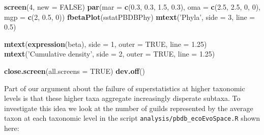 \documentclass[]{article}
\newenvironment{Shaded}{\begin{snugshade}}{\end{snugshade}}
\newcommand{\KeywordTok}[1]{\textcolor[rgb]{0.13,0.29,0.53}{\textbf{#1}}}
\newcommand{\DataTypeTok}[1]{\textcolor[rgb]{0.13,0.29,0.53}{#1}}
\newcommand{\DecValTok}[1]{\textcolor[rgb]{0.00,0.00,0.81}{#1}}
\newcommand{\FloatTok}[1]{\textcolor[rgb]{0.00,0.00,0.81}{#1}}
\newcommand{\StringTok}[1]{\textcolor[rgb]{0.31,0.60,0.02}{#1}}
\newcommand{\OtherTok}[1]{\textcolor[rgb]{0.56,0.35,0.01}{#1}}
\newcommand{\NormalTok}[1]{#1}
\begin{document}
\begin{Shaded}
\begin{Highlighting}[]
\KeywordTok{screen}\NormalTok{(}\DecValTok{4}\NormalTok{, }\DataTypeTok{new =} \OtherTok{FALSE}\NormalTok{)}
\KeywordTok{par}\NormalTok{(}\DataTypeTok{mar =} \KeywordTok{c}\NormalTok{(}\FloatTok{0.3}\NormalTok{, }\FloatTok{0.3}\NormalTok{, }\FloatTok{1.5}\NormalTok{, }\FloatTok{0.3}\NormalTok{), }\DataTypeTok{oma =} \KeywordTok{c}\NormalTok{(}\FloatTok{2.5}\NormalTok{, }\FloatTok{2.5}\NormalTok{, }\DecValTok{0}\NormalTok{, }\DecValTok{0}\NormalTok{), }
    \DataTypeTok{mgp =} \KeywordTok{c}\NormalTok{(}\DecValTok{2}\NormalTok{, }\FloatTok{0.5}\NormalTok{, }\DecValTok{0}\NormalTok{))}
\KeywordTok{fbetaPlot}\NormalTok{(sstatPBDBPhy)}
\KeywordTok{mtext}\NormalTok{(}\StringTok{'Phyla'}\NormalTok{, }\DataTypeTok{side =} \DecValTok{3}\NormalTok{, }\DataTypeTok{line =} \FloatTok{0.5}\NormalTok{)}

\KeywordTok{mtext}\NormalTok{(}\KeywordTok{expression}\NormalTok{(beta), }\DataTypeTok{side =} \DecValTok{1}\NormalTok{, }\DataTypeTok{outer =} \OtherTok{TRUE}\NormalTok{, }\DataTypeTok{line =} \FloatTok{1.25}\NormalTok{)}
\KeywordTok{mtext}\NormalTok{(}\StringTok{'Cumulative density'}\NormalTok{, }\DataTypeTok{side =} \DecValTok{2}\NormalTok{, }\DataTypeTok{outer =} \OtherTok{TRUE}\NormalTok{, }\DataTypeTok{line =} \FloatTok{1.25}\NormalTok{)}

\KeywordTok{close.screen}\NormalTok{(}\DataTypeTok{all.screens =} \OtherTok{TRUE}\NormalTok{)}
\KeywordTok{dev.off}\NormalTok{()}
\end{Highlighting}
\end{Shaded}

Part of our argument about the failure of superstatistics at higher
taxonomic levels is that these higher taxa aggregate increasingly
disperate subtaxa. To investigate this idea we look at the number of
guilds represented by the average taxon at each taxonomic level in the
script \texttt{analysis/pbdb\_ecoEvoSpace.R} shown here:
\end{document}
